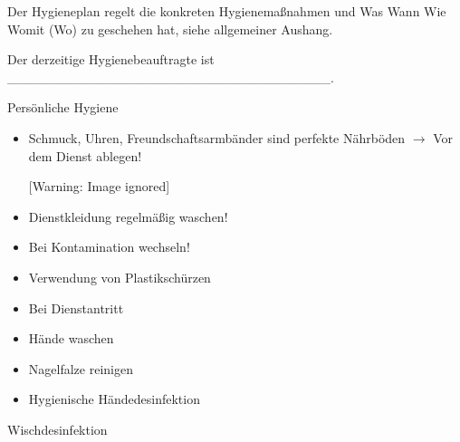 \documentclass{article}
\begin{document}
Der Hygieneplan regelt die konkreten Hygienema{\ss}nahmen und Was Wann
Wie Womit (Wo) zu geschehen hat, siehe allgemeiner Aushang.

Der derzeitige Hygienebeauftragte ist
\_\_\_\_\_\_\_\_\_\_\_\_\_\_\_\_\_\_\_\_\_\_\_\_\_\_\_\_\_\_\_\_\_\_.

Pers\"onliche Hygiene

\begin{itemize}
\item Schmuck, Uhren, Freundschaftsarmb\"ander sind perfekte
N\"ahrb\"oden ${\rightarrow}$ Vor dem Dienst ablegen!

\begin{center}
 [Warning: Image ignored] %

\end{center}
\item Dienstkleidung regelm\"a{\ss}ig waschen!

\item Bei Kontamination wechseln!

\item Verwendung von Plastiksch\"urzen

\item Bei Dienstantritt

\end{itemize}
\begin{itemize}
\item H\"ande waschen

\item Nagelfalze reinigen

\item {}Hygienische
H\"andedesinfektion

\end{itemize}
Wischdesinfektion
\end{document}
